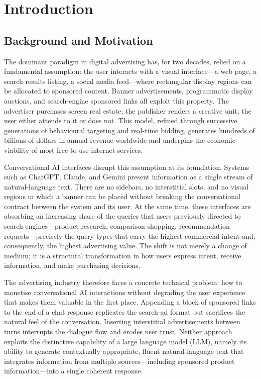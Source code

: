 \section{Introduction}
\label{sec:introduction}

\subsection{Background and Motivation}
\label{subsec:background}

The dominant paradigm in digital advertising has, for two decades, relied on a
fundamental assumption: the user interacts with a visual interface---a web page,
a search results listing, a social media feed---where rectangular display regions
can be allocated to sponsored content. Banner advertisements, programmatic
display auctions, and search-engine sponsored links all exploit this property.
The advertiser purchases screen real estate; the publisher renders a creative
unit; the user either attends to it or does not. This model, refined through
successive generations of behavioural targeting and real-time bidding, generates
hundreds of billions of dollars in annual revenue worldwide and underpins the
economic viability of most free-to-use internet services.

Conversational AI interfaces disrupt this assumption at its foundation. Systems
such as ChatGPT, Claude, and Gemini present information as a single stream of
natural-language text. There are no sidebars, no interstitial slots, and no
visual regions in which a banner can be placed without breaking the
conversational contract between the system and its user. At the same time, these
interfaces are absorbing an increasing share of the queries that users
previously directed to search engines---product research, comparison shopping,
recommendation requests---precisely the query types that carry the highest
commercial intent and, consequently, the highest advertising value. The shift is
not merely a change of medium; it is a structural transformation in how users
express intent, receive information, and make purchasing decisions.

The advertising industry therefore faces a concrete technical problem: how to
monetise conversational AI interactions without degrading the user experience
that makes them valuable in the first place. Appending a block of sponsored
links to the end of a chat response replicates the search-ad format but
sacrifices the natural feel of the conversation. Inserting interstitial
advertisements between turns interrupts the dialogue flow and erodes user trust.
Neither approach exploits the distinctive capability of a large language model
(LLM), namely its ability to generate contextually appropriate, fluent
natural-language text that integrates information from multiple sources---including
sponsored product information---into a single coherent response.

